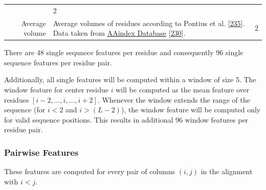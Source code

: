 \documentclass[11pt,a4paper,twoside]{book}
\theoremstyle{definition}
\theoremstyle{definition}
\theoremstyle{remark}
\begin{document}
\begin{longtable}[]{@{}rlc@{}}
\begin{minipage}[t]{0.50\columnwidth}
\end{minipage} & \begin{minipage}[t]{0.18\columnwidth}\centering\strut
2\strut
\end{minipage}\tabularnewline
\begin{minipage}[t]{0.23\columnwidth}\raggedleft\strut
Average volume\strut
\end{minipage} & \begin{minipage}[t]{0.50\columnwidth}\raggedright\strut
Average volumes of residues according to Pontius et al.
{[}\protect\hyperlink{ref-Pontius1996}{235}{]}. Data taken from
\href{http://www.genome.jp/dbget-bin/www_bget?aaindex:PONJ960101}{AAindex
Database} {[}\protect\hyperlink{ref-Kawashima2008}{230}{]}.\strut
\end{minipage} & \begin{minipage}[t]{0.18\columnwidth}\centering\strut
2\strut
\end{minipage}\tabularnewline
\bottomrule
\end{longtable}

There are 48 single sequnece features per residue and consequently 96
single sequence features per residue pair.

Additionally, all single features will be computed within a window of
size 5. The window feature for center residue \(i\) will be computed as
the mean feature over residues
\([i\!-\!2, \ldots, i, \ldots, i\!+\!2]\). Whenever the window extends
the range of the sequence (for \(i\!<\!2\) and \(i\!>\!(L-2)\)), the
window feature will be computed only for valid sequence positions. This
results in additional 96 window features per residue pair.

\subsubsection{Pairwise Features}\label{seq-features-pairwise}

These features are computed for every pair of columns \((i, j)\) in the
alignment with \(i<j\).
\end{document}

